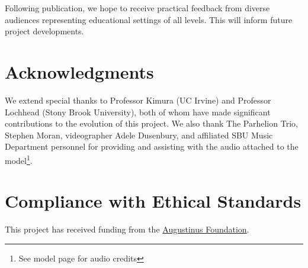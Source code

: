 \documentclass[sigconf]{nimeart}
\begin{document}
Following publication, we hope to receive practical feedback from diverse audiences representing educational settings of all levels. This will inform future project developments.

\section{Acknowledgments}\label{acknowledgments}

We extend special thanks to Professor Kimura (UC Irvine) and Professor Lochhead (Stony Brook University), both of whom have made significant contributions to the evolution of this project. We also thank The Parhelion Trio, Stephen Moran, videographer Adele Dusenbury, and affiliated SBU Music Department personnel for providing and assisting with the audio attached to the model\footnote{See model page for audio credits}.

\section{Compliance with Ethical Standards}\label{compliance-with-ethical-standards}

This project has received funding from the \href{https://augustinusfonden.dk/}{Augustinus Foundation}.
\end{document}
